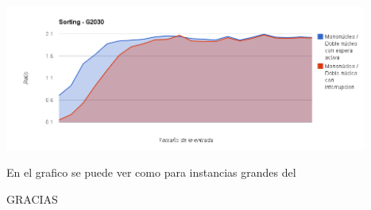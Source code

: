 \documentclass{beamer}
\begin{document}
\begin{frame}
  \begin{center} %
  \includegraphics[height=4.8cm]{images/sort_ipis_g2030.png}
  \end{center}
  En el grafico se puede ver como para instancias grandes del 
  
\end{frame}

\begin{frame}
  \begin{center}
  \huge GRACIAS
  \end{center}
\end{frame}
\end{document}
